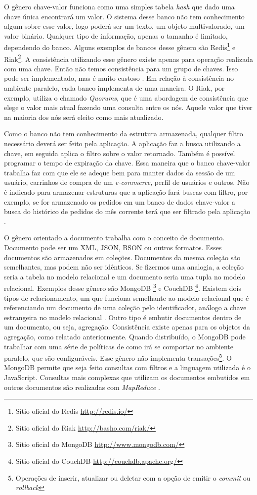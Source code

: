 O gênero chave-valor funciona como uma simples tabela \textit{hash} que dado uma chave única encontrará um valor. O sistema desse banco não tem conhecimento algum sobre esse valor, logo poderá ser um texto, um objeto multivalorado, um valor binário. Qualquer tipo de informação, apenas o tamanho é limitado, dependendo do banco. Alguns exemplos de bancos desse gênero são \ac{Redis}\footnote{Sítio oficial do Redis \url{http://redis.io/}} e Riak\footnote{Sítio oficial do Riak \url{http://basho.com/riak/}}.
A consistência utilizando esse gênero existe apenas para operação realizada com uma chave. Então não temos consistência para um grupo de chaves. Isso pode ser implementado, mas é muito custoso \cite{NoSQL}. Em relação à consistência no ambiente paralelo, cada banco implementa de uma maneira. O Riak, por exemplo, utiliza o chamado \textit{Quorums}, que é uma abordagem de consistência que elege o valor mais atual fazendo uma consulta entre os nós. Aquele valor que tiver na maioria dos nós será eleito como mais atualizado.

Como o banco não tem conhecimento da estrutura armazenada, qualquer filtro necessário deverá ser feito pela aplicação. A aplicação faz a busca utilizando a chave, em seguida aplica o filtro sobre o valor retornado. Também é possível programar o tempo de expiração da chave. Essa maneira que o banco chave-valor trabalha faz com que ele se adeque bem para manter dados da sessão de um usuário, carrinhos de compra de um \textit{e-commerce}, perfil de usuários e outros. Não é indicado para armazenar estruturas que a aplicação fará buscas com filtro, por exemplo, se for armazenado os pedidos em um banco de dados chave-valor a busca do histórico de pedidos do mês corrente terá que ser filtrado pela aplicação \cite{NoSQL}.

O gênero orientado a documento trabalha com o conceito de documento. Documento pode ser um \ac{XML}, JSON, BSON ou outros formatos. Esses documentos são armazenados em coleções. Documentos da mesma coleção são semelhantes, mas podem não ser idênticos. Se fizermos uma analogia, a coleção seria a tabela no modelo relacional e um documento seria uma tupla no modelo relacional. Exemplos desse gênero são MongoDB \footnote{Sítio oficial do MongoDB \url{http://www.mongodb.com/}} e CouchDB \footnote{Sítio oficial do CouchDB \url{http://couchdb.apache.org/}}\cite{NoSQL}.
Existem dois tipos de relacionamento, um que funciona semelhante ao modelo relacional que é referenciando um documento de uma coleção pelo identificador, análogo a chave estrangeira no modelo relacional . Outro tipo é embutir documentos dentro de um documento, ou seja, agregação. Consistência existe apenas para os objetos da agregação, como relatado anteriormente. Quando distribuído, o MongoDB pode trabalhar com uma série de políticas de como irá se comportar no ambiente paralelo, que são configuráveis. Esse gênero não implementa transações\footnote{Operações de inserir, atualizar ou deletar com a opção de emitir o \textit{commit} ou \textit{rollback}}. O MongoDB permite que seja feito consultas com filtros e a linguagem utilizada é o JavaScript. Consultas mais complexas que utilizam os documentos embutidos em outros documentos são realizadas com \textit{MapReduce} \cite{NoSQL}.

